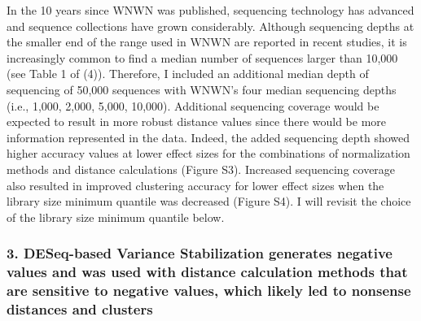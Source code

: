 \documentclass[
]{article}
\begin{document}
In the 10 years since WNWN was published, sequencing technology has
advanced and sequence collections have grown considerably. Although
sequencing depths at the smaller end of the range used in WNWN are
reported in recent studies, it is increasingly common to find a median
number of sequences larger than 10,000 (see Table 1 of (4)). Therefore,
I included an additional median depth of sequencing of 50,000 sequences
with WNWN's four median sequencing depths (i.e., 1,000, 2,000, 5,000,
10,000). Additional sequencing coverage would be expected to result in
more robust distance values since there would be more information
represented in the data. Indeed, the added sequencing depth showed
higher accuracy values at lower effect sizes for the combinations of
normalization methods and distance calculations (Figure S3). Increased
sequencing coverage also resulted in improved clustering accuracy for
lower effect sizes when the library size minimum quantile was decreased
(Figure S4). I will revisit the choice of the library size minimum
quantile below.

\hypertarget{deseq-based-variance-stabilization-generates-negative-values-and-was-used-with-distance-calculation-methods-that-are-sensitive-to-negative-values-which-likely-led-to-nonsense-distances-and-clusters}{%
\subsubsection{3. DESeq-based Variance Stabilization generates negative
values and was used with distance calculation methods that are sensitive
to negative values, which likely led to nonsense distances and
clusters}\label{deseq-based-variance-stabilization-generates-negative-values-and-was-used-with-distance-calculation-methods-that-are-sensitive-to-negative-values-which-likely-led-to-nonsense-distances-and-clusters}}
\end{document}
